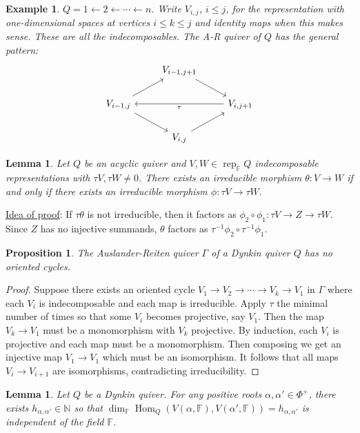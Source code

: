 \documentclass{book}
\newtheorem{lemma}[theorem]{Lemma}
\newtheorem{prop}[theorem]{Proposition}
\newtheorem{example}{Example}[section]
\DeclareMathOperator{\Hom}{Hom}
\DeclareMathOperator{\rep}{rep}
\begin{document}
    \begin{example}
        $Q=1\leftarrow 2\leftarrow\cdots\leftarrow n$. Write $V_{i,j}$, $i\leq j$, for the representation with one-dimensional spaces at vertices $i\leq k\leq j$ and identity maps when this makes sense. These are all the indecomposables. The A-R quiver of $Q$ has the general pattern:
        \[\begin{tikzcd}
            &V_{i-1,j+1}\arrow{dr}&\\
            V_{i-1,j}\arrow{ur}\arrow{dr}&&V_{i,j+1}\arrow{ll}{\tau}\\
            &V_{i,j}\arrow{ur}&
        \end{tikzcd}\]
    \end{example}
    
    \begin{lemma}
        Let $Q$ be an acyclic quiver and $V,W\in\rep_\mathbb{F}Q$ indecomposable representations with $\tau V, \tau W\neq 0$. There exists an irreducible morphism $\theta:V\to W$ if and only if there exists an irreducible morphism $\phi:\tau V\to\tau W.$
    \end{lemma}
    
    \underline{Idea of proof}: If $\tau\theta$ is not irreducible, then it factors as $\phi_2\circ\phi_1:\tau V\to Z\to\tau W$. Since $Z$ has no injective summands, $\theta$ factors as $\tau^{-1}\phi_2\circ \tau^{-1}\phi_1.$
    
    
    \begin{prop}
        The Auslander-Reiten quiver $\Gamma$ of a Dynkin quiver $Q$ has no oriented cycles. 
    \end{prop}
    
    \begin{proof}
        Suppose there exists an oriented cycle $V_1\to V_2\to \cdots\to V_k \to V_1$ in $\Gamma$ where each $V_i$ is indecomposable and each map is irreducible. Apply $\tau$ the minimal number of times so that some $V_i$ becomes projective, say $V_1$. Then the map $V_k\to V_1$ must be a monomorphism with $V_k$ projective. By induction, each $V_i$ is projective and each map must be a monomorphism. Then composing we get an injective map $V_1\to V_1$ which must be an isomorphism. It follows that all maps $V_i\to V_{i+1}$ are isomorphisms, contradicting irreducibility. 
    \end{proof}
    
    \begin{lemma}
        Let $Q$ be a Dynkin quiver. For any positive roots $\alpha,\alpha'\in\Phi^+$, there exists $h_{\alpha,\alpha'}\in\mathbb{N}$ so that $\dim_\mathbb{F}\Hom_Q(V(\alpha,\mathbb{F}),V(\alpha',\mathbb{F}))=h_{\alpha,\alpha'}$ is independent of the field $\mathbb{F}$.
    \end{lemma}
    
\end{document}
